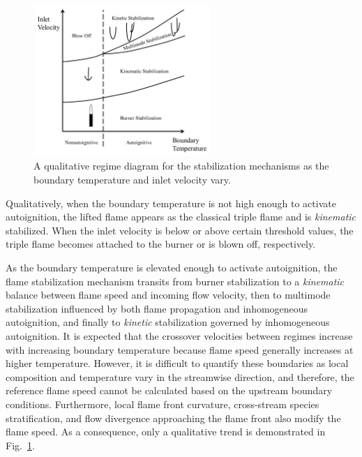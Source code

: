 \documentclass{wssci}
\begin{document}
\begin{figure}
  \centering
  \scriptsize
  \vspace{-0.1in}
  \includegraphics[width=0.6\textwidth]{2D-regime.png}
  \normalsize
  \vspace{-0.1in}
  \caption{A qualitative regime diagram for the stabilization mechanisms as the boundary temperature and inlet velocity vary. }
  \label{fig:2D-regime}
\end{figure}

Qualitatively, when the boundary temperature is not high enough to activate autoignition, the lifted flame appears as the classical triple flame and is \emph{kinematic} stabilized.  When the inlet velocity is below or above certain threshold values, the triple flame becomes attached to the burner or is blown off, respectively.  

As the boundary temperature is elevated enough to activate autoignition, the flame stabilization mechanism transits from burner stabilization to a \emph{kinematic} balance between flame speed and incoming flow velocity, then to multimode stabilization influenced by both flame propagation and inhomogeneous autoignition, and finally to \emph {kinetic} stabilization governed by inhomogeneous autoignition.  It is expected that the crossover velocities between regimes increase with increasing boundary temperature because flame speed generally increases at higher temperature.  However, it is difficult to quantify these boundaries as local composition and temperature vary in the streamwise direction, and therefore, the reference flame speed cannot be calculated based on the upstream boundary conditions.  Furthermore, local flame front curvature, cross-stream species stratification, and flow divergence approaching the flame front also modify the flame speed.  As a consequence, only a qualitative trend is demonstrated in Fig.~\ref{fig:2D-regime}.  
\end{document}
